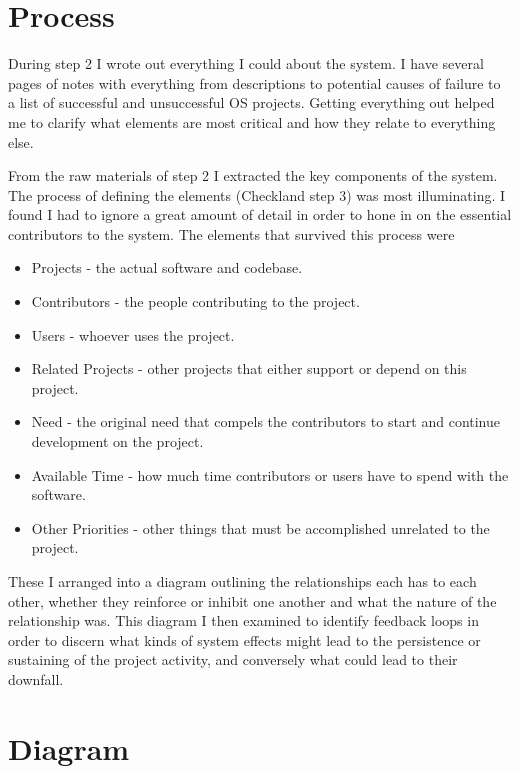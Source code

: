 \documentclass[10pt]{article}
\begin{document}
\section{Process}

During step 2 I wrote out everything I could about the system.  I have several pages of notes with everything from descriptions to potential causes of failure to a list of successful and unsuccessful OS projects.  Getting everything out helped me to clarify what elements are most critical and how they relate to everything else.  

From the raw materials of step 2 I extracted the key components of the system.  The process of defining the elements (Checkland step 3) was most illuminating.  I found I had to ignore a great amount of detail in order to hone in on the essential contributors to the system.  The elements that survived this process were 

\begin{itemize}
\item Projects - the actual software and codebase.
\item Contributors - the people contributing to the project.
\item Users - whoever uses the project.
\item Related Projects - other projects that either support or depend on this project.
\item Need - the original need that compels the contributors to start and continue development on the project.
\item Available Time - how much time contributors or users have to spend with the software.
\item Other Priorities - other things that must be accomplished unrelated to the project.
\end{itemize}

These I arranged into a diagram outlining the relationships each has to each other, whether they reinforce or inhibit one another and what the nature of the relationship was.  This diagram I then examined to identify feedback loops in order to discern what kinds of system effects might lead to the persistence or sustaining of the project activity, and conversely what could lead to their downfall.

\section{Diagram}
\end{document}
